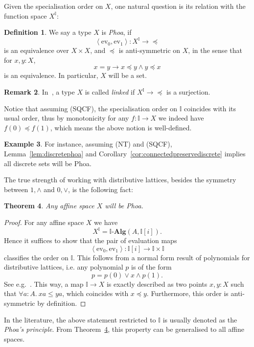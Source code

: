 \documentclass[12pt]{amsart}
\newtheorem{theorem}{Theorem}[section]
\theoremstyle{definition}
\newtheorem{example}[theorem]{Example}
\newtheorem{definition}[theorem]{Definition}
\newtheorem{remark}[theorem]{Remark}
\newcommand{\mb}[1]{\mathbf{#1}}
\newcommand{\mbb}[1]{\mathbb{#1}}
\newcommand{\I}{\mbb I}
\newcommand{\alg}{\text{-}\mb{Alg}}
\newcommand{\pair}[1]{\left\langle#1\right\rangle}
\newcommand{\ev}{\mathrm{ev}}
\newcommand{\fa}[2]{\forall #1\!\colon\!\!#2.\ }
\begin{document}
Given the specialisation order on $X$, one natural question is its relation with the function space $X^\I$: 

\begin{definition}\label{def:phoa}
  We say a type $X$ is \emph{Phoa}, if 
  \[ \pair{\ev_0,\ev_1} : X^\I \to \operatorname{\preceq} \]
  is an equivalence over $X \times X$, and $\preceq$ is anti-symmetric on $X$, in the sense that for $x,y :X$,
  \[ x = y \to x \preceq y \wedge y \preceq x \]
  is an equivalence. In particular, $X$ will be a set.
\end{definition}

\begin{remark}
  In~\cite{PhoaWesleyKym-Son1991DtiR}, a type $X$ is called \emph{linked} if $X^\I \to \operatorname{\preceq}$ is a surjection.
\end{remark}

Notice that assuming (SQCF), the specialisation order on $\I$ coincides with its usual order, thus by monotonicity for any $f : \I \to X$ we indeed have $f(0) \preceq f(1)$, which means the above notion is well-defined.

\begin{example}
  For instance, assuming (NT) and (SQCF), Lemma~\ref{lem:discretephoa} and Corollary~\ref{cor:connectedpreservediscrete} implies all discrete sets will be Phoa.
\end{example}

The true strength of working with distributive lattices, besides the symmetry between $1,\wedge$ and $0,\vee$, is the following fact:

\begin{theorem}\label{thm:phoaaffine}
  Any affine space $X$ will be Phoa.
\end{theorem}
\begin{proof}
  For any affine space $X$ we have 
  \[ X^\I = \I\alg(A,\I[i]). \]
  Hence it suffices to show that the pair of evaluation maps
  \[ \pair{\ev_0,\ev_1} : \I[i] \to \I \times \I \]
  classifies the order on $\I$. This follows from a normal form result of polynomials for distributive lattices, i.e. any polynomial $p$ is of the form 
  \[ p = p(0) \vee x \wedge p(1). \]
  See e.g.~\cite[Thm. 10.11]{lausch2000algebra}. This way, a map $\I \to X$ is exactly described as two points $x,y : X$ such that $\fa aA xa \le ya$, which coincides with $x \preceq y$. Furthermore, this order is anti-symmetric by definition.
\end{proof}

In the literature, the above statement restricted to $\I$ is usually denoted as the \emph{Phoa's principle}. From Theorem~\ref{thm:phoaaffine}, this property can be generalised to all affine spaces.
\end{document}
